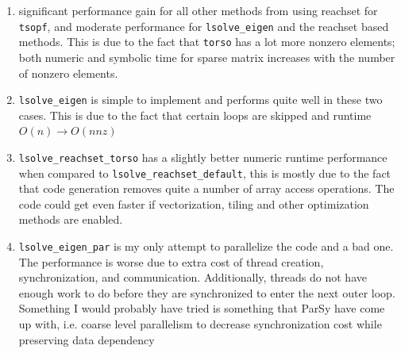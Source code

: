 \documentclass[12pt]{article}
\begin{document}
\begin{enumerate}
    \item significant performance gain for all other methods from using reachset for \texttt{tsopf}, and moderate performance for \texttt{lsolve\_eigen} and the reachset based methods. This is due to the fact that \texttt{torso} has a lot more nonzero elements; both numeric and symbolic time for sparse matrix increases with the number of nonzero elements. 
    \item \texttt{lsolve\_eigen} is simple to implement and performs quite well in these two cases. This is due to the fact that certain loops are skipped and runtime $O(n) \rightarrow O(nnz)$
    \item \texttt{lsolve\_reachset\_torso} has a slightly better numeric runtime performance when compared to \texttt{lsolve\_reachset\_default}, this is mostly due to the fact that code generation removes quite a number of array access operations. The code could get even faster if vectorization, tiling and other optimization methods are enabled.
    \item \texttt{lsolve\_eigen\_par} is my only attempt to parallelize the code and a bad one. The performance is worse due to extra cost of thread creation, synchronization, and communication. Additionally, threads do not have enough work to do before they are synchronized to enter the next outer loop. Something I would probably have tried is something that ParSy have come up with, i.e. coarse level parallelism to decrease synchronization cost while preserving data dependency
\end{enumerate}
\end{document}
